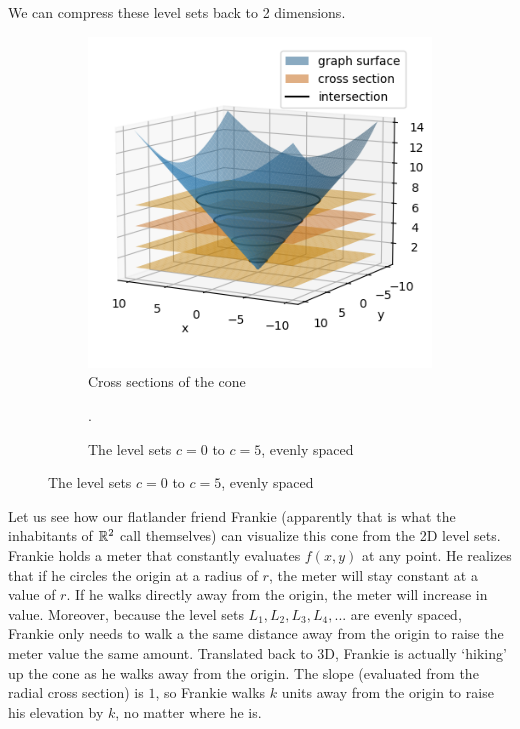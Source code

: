 We can compress these level sets back to 2 dimensions.
\begin{figure}[h]
    \centering
    \begin{subfigure}[l]{0.46\textwidth}
    \centering
    \includegraphics[width=\textwidth]{Rn_function/cone.png}
    \caption{Cross sections of the cone}
    \end{subfigure}
    \begin{subfigure}[r]{0.5\textwidth} 
        \centering
{}
\caption{The level sets $c=0$ to $c=5$, evenly spaced}.
    \end{subfigure}
\end{figure}

Let us see how our flatlander friend Frankie (apparently that is what the inhabitants of $\mathbb{R}^2$ call themselves) can visualize this cone from the 2D level sets. Frankie holds a meter that constantly evaluates $f(x,y)$ at any point. He realizes that if he circles the origin at a radius of $r$, the meter will stay constant at a value of $r$. If he walks directly away from the origin, the meter will increase in value. Moreover, because the level sets $L_1,L_2,L_3,L_4,...$ are evenly spaced, Frankie only needs to walk a the same distance away from the origin to raise the meter value the same amount. Translated back to 3D, Frankie is actually `hiking' up the cone as he walks away from the origin. The slope (evaluated from the radial cross section) is $1$, so Frankie walks $k$ units away from the origin to raise his elevation by $k$, no matter where he is.

